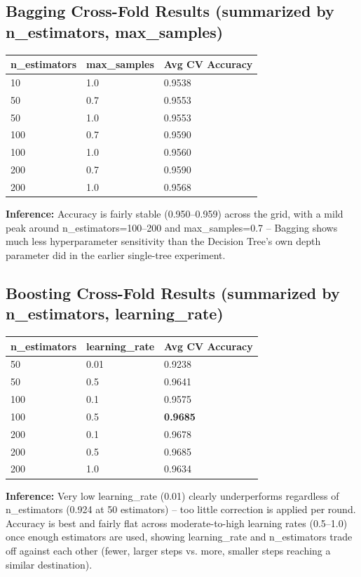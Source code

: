 \documentclass[12pt,a4paper]{article}
\begin{document}
\subsection*{Bagging Cross-Fold Results (summarized by n\_estimators, max\_samples)}
\begin{longtable}{|p{3cm}|p{3cm}|p{4cm}|}
\hline
\textbf{n\_estimators} & \textbf{max\_samples} & \textbf{Avg CV Accuracy} \\ \hline
\endhead
10 & 1.0 & 0.9538 \\ \hline
50 & 0.7 & 0.9553 \\ \hline
50 & 1.0 & 0.9553 \\ \hline
100 & 0.7 & 0.9590 \\ \hline
100 & 1.0 & 0.9560 \\ \hline
200 & 0.7 & 0.9590 \\ \hline
200 & 1.0 & 0.9568 \\ \hline
\end{longtable}
\textbf{Inference:} Accuracy is fairly stable (0.950--0.959) across the grid, with a mild
peak around n\_estimators=100--200 and max\_samples=0.7 -- Bagging shows much less
hyperparameter sensitivity than the Decision Tree's own depth parameter did in the earlier
single-tree experiment.

\subsection*{Boosting Cross-Fold Results (summarized by n\_estimators, learning\_rate)}
\begin{longtable}{|p{3cm}|p{3cm}|p{4cm}|}
\hline
\textbf{n\_estimators} & \textbf{learning\_rate} & \textbf{Avg CV Accuracy} \\ \hline
\endhead
50 & 0.01 & 0.9238 \\ \hline
50 & 0.5 & 0.9641 \\ \hline
100 & 0.1 & 0.9575 \\ \hline
100 & 0.5 & \textbf{0.9685} \\ \hline
200 & 0.1 & 0.9678 \\ \hline
200 & 0.5 & 0.9685 \\ \hline
200 & 1.0 & 0.9634 \\ \hline
\end{longtable}
\textbf{Inference:} Very low learning\_rate (0.01) clearly underperforms regardless of
n\_estimators (0.924 at 50 estimators) -- too little correction is applied per round. Accuracy
is best and fairly flat across moderate-to-high learning rates (0.5--1.0) once enough
estimators are used, showing learning\_rate and n\_estimators trade off against each other
(fewer, larger steps vs. more, smaller steps reaching a similar destination).
\end{document}
